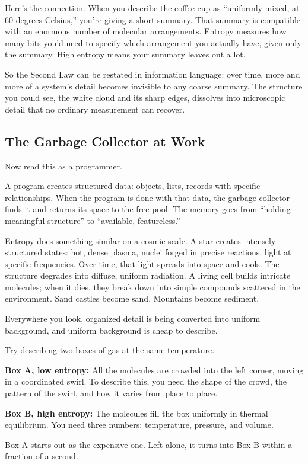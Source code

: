 Here's the connection. When you describe the coffee cup as ``uniformly mixed, at 60 degrees Celsius,'' you're giving a short summary. That summary is compatible with an enormous number of molecular arrangements. Entropy measures how many bits you'd need to specify which arrangement you actually have, given only the summary. High entropy means your summary leaves out a lot.

So the Second Law can be restated in information language: over time, more and more of a system's detail becomes invisible to any coarse summary. The structure you could see, the white cloud and its sharp edges, dissolves into microscopic detail that no ordinary measurement can recover.

\subsection{The Garbage Collector at Work}

Now read this as a programmer.

A program creates structured data: objects, lists, records with specific relationships. When the program is done with that data, the garbage collector finds it and returns its space to the free pool. The memory goes from ``holding meaningful structure'' to ``available, featureless.''

Entropy does something similar on a cosmic scale. A star creates intensely structured states: hot, dense plasma, nuclei forged in precise reactions, light at specific frequencies. Over time, that light spreads into space and cools. The structure degrades into diffuse, uniform radiation. A living cell builds intricate molecules; when it dies, they break down into simple compounds scattered in the environment. Sand castles become sand. Mountains become sediment.

Everywhere you look, organized detail is being converted into uniform background, and uniform background is cheap to describe.

\begin{examplebox}
Try describing two boxes of gas at the same temperature.

\textbf{Box A, low entropy:} All the molecules are crowded into the left corner, moving in a coordinated swirl. To describe this, you need the shape of the crowd, the pattern of the swirl, and how it varies from place to place.

\textbf{Box B, high entropy:} The molecules fill the box uniformly in thermal equilibrium. You need three numbers: temperature, pressure, and volume.

Box A starts out as the expensive one. Left alone, it turns into Box B within a fraction of a second.
\end{examplebox}

